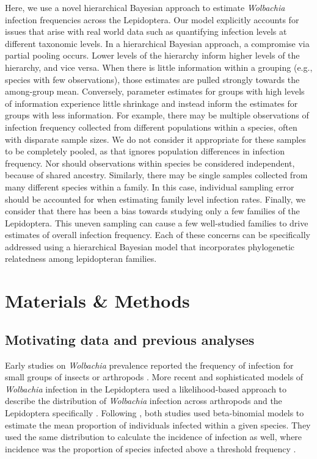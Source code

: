 \documentclass{frontiersSCNS}
\begin{document}
Here, we use a novel hierarchical Bayesian approach to estimate \textit{Wolbachia} infection frequencies across the Lepidoptera. Our model explicitly accounts for issues that arise with real world data such as quantifying infection levels at different taxonomic levels. In a hierarchical Bayesian approach, a compromise via partial pooling occurs. Lower levels of the hierarchy inform higher levels of the hierarchy, and vice versa. When there is little information within a grouping (e.g., species with few observations), those estimates are pulled strongly towards the among-group mean. Conversely, parameter estimates for groups with high levels of information experience little shrinkage and instead inform the estimates for groups with less information. For example, there may be multiple observations of infection frequency collected from different populations within a species, often with disparate sample sizes. We do not consider it appropriate for these samples to be completely pooled, as that ignores population differences in infection frequency. Nor should observations within species be considered independent, because of shared ancestry. Similarly, there may be single samples collected from many different species within a family. In this case, individual sampling error should be accounted for when estimating family level infection rates. Finally, we consider that there has been a bias towards studying only a few families of the Lepidoptera. This uneven sampling can cause a few well-studied families to drive estimates of overall infection frequency. Each of these concerns can be specifically addressed using a hierarchical Bayesian model that incorporates phylogenetic relatedness among lepidopteran families. 


\section{Materials \& Methods}
\subsection{Motivating data and previous analyses}
Early studies on \textit{Wolbachia} prevalence reported the frequency of infection for small groups of insects or arthropods \citep{Jiggins:2001uo,Werren:2000p7408}. More recent and sophisticated models of \emph{Wolbachia} infection in the Lepidoptera used a likelihood-based approach to describe the distribution of \emph{Wolbachia} infection across arthropods \citep{Weinert:2015aa} and the Lepidoptera specifically \citep{Ahmed:2015aa}. Following \citet{Hilgenboecker:2008aa}, both studies used beta-binomial models to estimate the mean proportion of individuals infected within a given species. They used the same distribution to calculate the incidence of infection as well, where incidence was the proportion of species infected above a threshold frequency \citep[i.e., one infection in 1000 individuals, or 0.001;][]{Weinert:2015aa}. 
\end{document}
